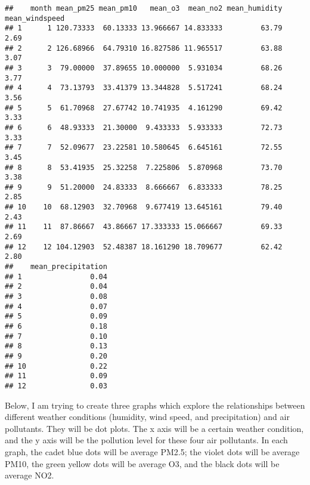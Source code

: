 \documentclass[
]{article}
\newenvironment{Shaded}{\begin{snugshade}}{\end{snugshade}}
\newcommand{\AttributeTok}[1]{\textcolor[rgb]{0.77,0.63,0.00}{#1}}
\newcommand{\DecValTok}[1]{\textcolor[rgb]{0.00,0.00,0.81}{#1}}
\newcommand{\FloatTok}[1]{\textcolor[rgb]{0.00,0.00,0.81}{#1}}
\newcommand{\FunctionTok}[1]{\textcolor[rgb]{0.00,0.00,0.00}{#1}}
\newcommand{\NormalTok}[1]{#1}
\newcommand{\SpecialCharTok}[1]{\textcolor[rgb]{0.00,0.00,0.00}{#1}}
\newcommand{\StringTok}[1]{\textcolor[rgb]{0.31,0.60,0.02}{#1}}
\begin{document}
\begin{verbatim}
##    month mean_pm25 mean_pm10   mean_o3  mean_no2 mean_humidity mean_windspeed
## 1      1 120.73333  60.13333 13.966667 14.833333         63.79           2.69
## 2      2 126.68966  64.79310 16.827586 11.965517         63.88           3.07
## 3      3  79.00000  37.89655 10.000000  5.931034         68.26           3.77
## 4      4  73.13793  33.41379 13.344828  5.517241         68.24           3.56
## 5      5  61.70968  27.67742 10.741935  4.161290         69.42           3.33
## 6      6  48.93333  21.30000  9.433333  5.933333         72.73           3.33
## 7      7  52.09677  23.22581 10.580645  6.645161         72.55           3.45
## 8      8  53.41935  25.32258  7.225806  5.870968         73.70           3.38
## 9      9  51.20000  24.83333  8.666667  6.833333         78.25           2.85
## 10    10  68.12903  32.70968  9.677419 13.645161         79.40           2.43
## 11    11  87.86667  43.86667 17.333333 15.066667         69.33           2.69
## 12    12 104.12903  52.48387 18.161290 18.709677         62.42           2.80
##    mean_precipitation
## 1                0.04
## 2                0.04
## 3                0.08
## 4                0.07
## 5                0.09
## 6                0.18
## 7                0.10
## 8                0.13
## 9                0.20
## 10               0.22
## 11               0.09
## 12               0.03
\end{verbatim}

Below, I am trying to create three graphs which explore the
relationships between different weather conditions (humidity, wind
speed, and precipitation) and air pollutants. They will be dot plots.
The x axis will be a certain weather condition, and the y axis will be
the pollution level for these four air pollutants. In each graph, the
cadet blue dots will be average PM2.5; the violet dots will be average
PM10, the green yellow dots will be average O3, and the black dots will
be average NO2.

\begin{Shaded}
\end{Shaded}
\end{document}
